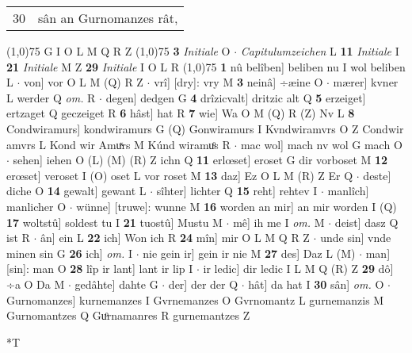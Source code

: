 \documentclass[8pt,a4paper,notitlepage]{article}
\begin{document}
\begin{table}[ht]
\begin{minipage}[t]{0.5\linewidth}
\begin{tabular}{rl}
30 & sân an Gurnomanzes rât,\\ 
\end{tabular}
\scriptsize
\line(1,0){75} \newline
G I O L M Q R Z \newline
\line(1,0){75} \newline
\textbf{3} \textit{Initiale} O   $\cdot$ \textit{Capitulumzeichen} L  \textbf{11} \textit{Initiale} I  \textbf{21} \textit{Initiale} M Z  \textbf{29} \textit{Initiale} I O L R  \newline
\line(1,0){75} \newline
\textbf{1} nû belîben] beliben nu I wol beliben L  $\cdot$ von] vor O L M (Q) R Z  $\cdot$ vrî] [dry]: vry M \textbf{3} neinâ] ÷æine O  $\cdot$ mærer] kvner L werder Q \textit{om.} R  $\cdot$ degen] dedgen G \textbf{4} drîzicvalt] dritzic alt Q \textbf{5} erzeiget] ertzaget Q geczeiget R \textbf{6} hâst] hat R \textbf{7} wie] Wa O M (Q) R (Z) Nv L \textbf{8} Condwiramurs] kondwiramurs G (Q) Gonwiramurs I Kvndwiramvrs O Z Condwir amvrs L Kond wir Amuͯrs M Kúnd wiramuͦs R  $\cdot$ mac wol] mach nv wol G mach O  $\cdot$ sehen] iehen O (L) (M) (R) Z ichn Q \textbf{11} erlœset] eroset G dir vorboset M \textbf{12} erœset] veroset I (O) oset L vor roset M \textbf{13} daz] Ez O L M (R) Z Er Q  $\cdot$ deste] diche O \textbf{14} gewalt] gewant L  $\cdot$ sîhter] lichter Q \textbf{15} reht] rehtev I  $\cdot$ manlîch] manlicher O  $\cdot$ wünne] [truwe]: wunne M \textbf{16} worden an mir] an mir worden I (Q) \textbf{17} woltstû] soldest tu I \textbf{21} tuostû] Mustu M  $\cdot$ mê] ih me I \textit{om.} M  $\cdot$ deist] dasz Q ist R  $\cdot$ ân] ein L \textbf{22} ich] Won ich R \textbf{24} mîn] mir O L M Q R Z  $\cdot$ unde sin] vnde minen sin G \textbf{26} ich] \textit{om.} I  $\cdot$ nie gein ir] gein ir nie M \textbf{27} des] Daz L (M)  $\cdot$ man] [sin]: man O \textbf{28} lîp ir lant] lant ir lip I  $\cdot$ ir ledic] dir ledic I L M Q (R) Z \textbf{29} dô] ÷a O Da M  $\cdot$ gedâhte] dahte G  $\cdot$ der] der der Q  $\cdot$ hât] da hat I \textbf{30} sân] \textit{om.} O  $\cdot$ Gurnomanzes] kurnemanzes I Gvrnemanzes O Gvrnomantz L gurnemanzis M Gurnomantzes Q Guͦrnamanres R gurnemantzes Z \newline
\end{minipage}
\hspace{0.5cm}
\begin{minipage}[t]{0.5\linewidth}
\small
\begin{center}*T
\end{center}
\begin{tabular}{rl}

\end{tabular}
\end{minipage}
\end{table}
\end{document}
